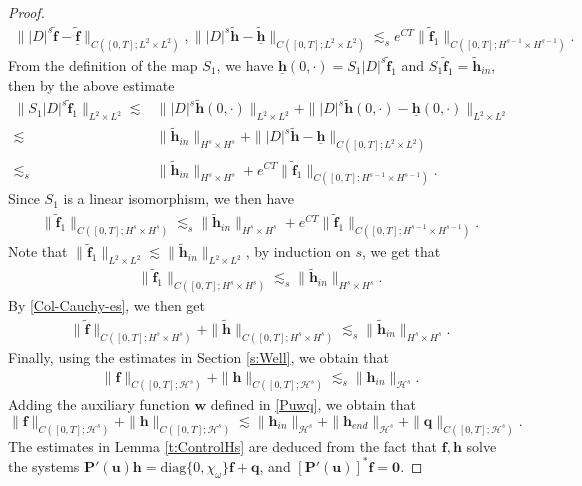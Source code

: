 \documentclass[12pt]{amsart}
\theoremstyle{remark}
\theoremstyle{definition}
\numberwithin{equation}{section}
\renewcommand{\H}{{\mathcal H }}
\begin{document}
\begin{proof}
\begin{align*}
  \| |D|^s\widetilde{\mathbf{f}}-\underline{\widetilde{\mathbf{f}}}\|_{C([0,T]; L^2\times L^2)}, \| |D|^s\widetilde{\mathbf{h}}-\underline{\widetilde{\mathbf{h}}}\|_{C([0,T]; L^2\times L^2)} \lesssim_s e^{CT} \|\widetilde{\mathbf{f}}_1\|_{C([0,T]; H^{s-1}\times H^{s-1})}.
\end{align*}
From the definition of the map $S_1$, we have $\underline{\mathbf{h}}(0,\cdot)=S_1|D|^s\widetilde{\mathbf{f}}_1$ and $S_1\widetilde{\mathbf{f}}_1=\widetilde{\mathbf{h}}_{in}$, then by the above estimate
\begin{align*}
  \|S_1|D|^s\widetilde{\mathbf{f}}_1\|_{L^2\times L^2} \lesssim& \||D|^s\widetilde{\mathbf{h}}(0,\cdot)\|_{L^2\times L^2} +\||D|^s\widetilde{\mathbf{h}}(0,\cdot)-\underline{\mathbf{h}}(0,\cdot)\|_{L^2\times L^2} \\
  \lesssim&
\|\widetilde{\mathbf{h}}_{in}\|_{H^s\times H^s}+\||D|^s\widetilde{\mathbf{h}}-\underline{\mathbf{h}}\|_{C([0,T];L^2\times L^2)}\\
\lesssim_s&\|\widetilde{\mathbf{h}}_{in}\|_{H^s\times H^s}+e^{CT} \|\widetilde{\mathbf{f}}_1\|_{C([0,T]; H^{s-1}\times H^{s-1})}.
\end{align*}
Since $S_1$ is a linear isomorphism, we then have
\begin{align*}
\|\widetilde{\mathbf{f}}_1\|_{C([0,T]; H^{s}\times H^{s})}\lesssim_s \|\widetilde{\mathbf{h}}_{in}\|_{H^s\times H^s}+e^{CT} \|\widetilde{\mathbf{f}}_1\|_{C([0,T]; H^{s-1}\times H^{s-1})}. 
\end{align*}
Note that $\|\widetilde{\mathbf{f}}_1\|_{L^2\times L^2}\lesssim \|\widetilde{\mathbf{h}}_{in}\|_{L^2\times L^2}$, by induction on $s$, we get that
\begin{align*}
\|\widetilde{\mathbf{f}}_1\|_{C([0,T]; H^{s}\times H^{s})}\lesssim_s \|\widetilde{\mathbf{h}}_{in}\|_{H^s\times H^s}.
\end{align*}
By \eqref{Col-Cauchy-es}, we then get
\begin{align*}
\|\widetilde{\mathbf{f}}\|_{C([0,T]; H^s\times H^s)}+\|\widetilde{\mathbf{h}}\|_{C([0,T]; H^s\times H^s)}\lesssim_s \|\widetilde{\mathbf{h}}_{in}\|_{H^s\times H^s}.
\end{align*}
Finally, using the estimates in Section \ref{s:Well}, we obtain that
\begin{align*}
\|\mathbf{f}\|_{C([0,T]; \H^s)}+\|\mathbf{h}\|_{C([0,T]; \H^s)}\lesssim_s \|\mathbf{h}_{in}\|_{\H^s}.
\end{align*}
Adding the auxiliary function $\mathbf{w}$ defined in \eqref{Puwq}, we obtain that
\begin{equation*}
 \|\mathbf{f}\|_{C([0,T]; \H^s)} + \|\mathbf{h}\|_{C([0,T]; \H^s)} \lesssim \|\mathbf{h}_{in}\|_{\H^s} + \|\mathbf{h}_{end}\|_{\H^s} + \|\mathbf{q}\|_{C([0,T]; \H^s)}.
\end{equation*}
The estimates in Lemma \ref{t:ControlHs} are deduced from the fact that $\mathbf{f},\mathbf{h}$ solve the systems $\mathbf{P}'(\mathbf{u}) \mathbf{h} =\text{diag}\{0, \chi_\omega \}\mathbf{f}+ \mathbf{q}$, and $[\mathbf{P}'(\mathbf{u})]^*\mathbf{f}= \mathbf{0}$.
\end{proof}
\end{document}
